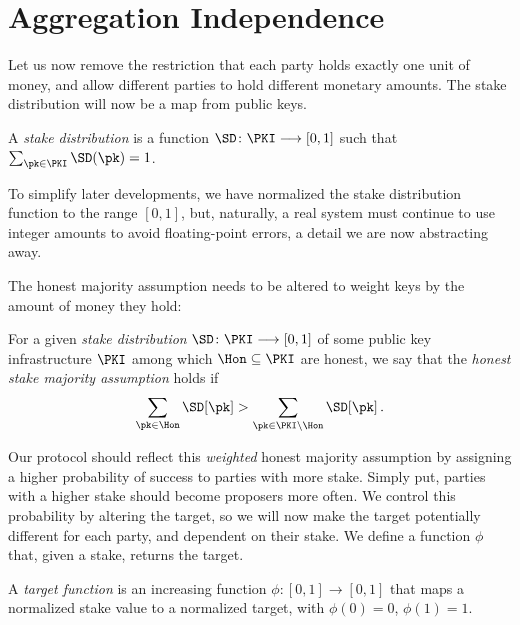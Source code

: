 \section{Aggregation Independence}

Let us now remove the restriction that each party holds exactly one unit of money,
and allow different parties to hold different monetary amounts. The stake distribution
will now be a map from public keys.

\begin{definition}
  A \emph{stake distribution} is a function $\SD\colon \PKI \longrightarrow [0, 1]$
  such that $\sum_{\pk \in \PKI} \SD(\pk) = 1$.
\end{definition}

To simplify later developments, we have normalized the stake distribution function
to the range $[0, 1]$, but, naturally, a real system must continue to use integer amounts
to avoid floating-point errors, a detail we are now abstracting away.

The honest majority
assumption needs to be altered to weight keys by the amount of money they hold:

\begin{definition}
  For a given \emph{stake distribution} $\SD\colon \PKI \longrightarrow [0, 1]$
  of some public key infrastructure $\PKI$ among which $\Hon \subseteq \PKI$ are honest, we say
  that the \emph{honest stake majority assumption} holds if
  \[
    \sum_{\pk \in \Hon} \SD[\pk] > \sum_{\pk \in \PKI \setminus \Hon} \SD[\pk]\,.
  \]
\end{definition}

Our protocol should reflect this \emph{weighted} honest majority assumption by assigning
a higher probability of success to parties with more stake. Simply put, parties with
a higher stake should become proposers more often. We control this probability by altering
the target, so we will now make the target potentially different for each party, and
dependent on their stake. We define a function $\phi$ that, given a stake, returns
the target.


\begin{definition}
  A \emph{target function} is an increasing function $\phi\colon [0, 1] \longrightarrow [0, 1]$ that maps
  a normalized stake value to a normalized target, with $\phi(0) = 0$, $\phi(1) = 1$.
\end{definition}

